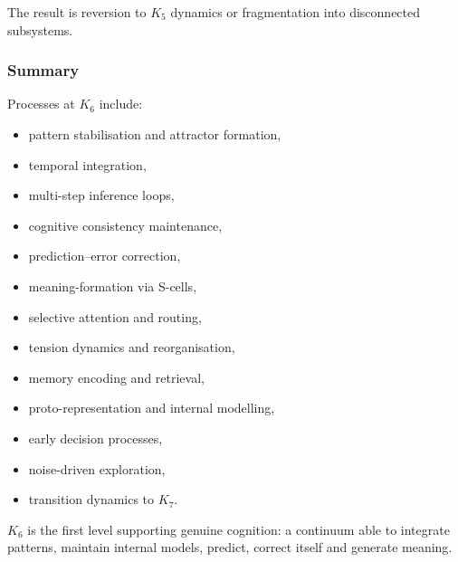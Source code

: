 The result is reversion to $K_5$ dynamics or fragmentation into 
disconnected subsystems.

\subsubsection{Summary}

Processes at $K_6$ include:
\begin{itemize}
    \item pattern stabilisation and attractor formation,
    \item temporal integration,
    \item multi-step inference loops,
    \item cognitive consistency maintenance,
    \item prediction–error correction,
    \item meaning-formation via S-cells,
    \item selective attention and routing,
    \item tension dynamics and reorganisation,
    \item memory encoding and retrieval,
    \item proto-representation and internal modelling,
    \item early decision processes,
    \item noise-driven exploration,
    \item transition dynamics to $K_7$.
\end{itemize}

$K_6$ is the first level supporting genuine cognition: 
a continuum able to integrate patterns, maintain internal models, 
predict, correct itself and generate meaning.
